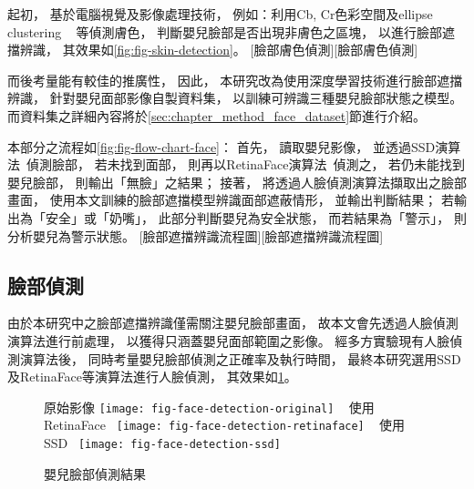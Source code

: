 \documentclass[class=NCU_thesis, crop=false]{standalone}
\begin{document}
起初，
基於電腦視覺及影像處理技術，
例如：利用Cb, Cr色彩空間及ellipse clustering
~\cite{tang_hands_2008, li_face_2011, noauthor_python_nodate, walkonnet_python_nodate}
等偵測膚色，
判斷嬰兒臉部是否出現非膚色之區塊，
以進行臉部遮擋辨識，
其效果如\cref{fig:fig-skin-detection}。
[臉部膚色偵測][臉部膚色偵測]

而後考量能有較佳的推廣性，
因此，
本研究改為使用深度學習技術進行臉部遮擋辨識，
針對嬰兒面部影像自製資料集，
以訓練可辨識三種嬰兒臉部狀態之模型。
而資料集之詳細內容將於\ref{sec:chapter_method_face_dataset}節進行介紹。

本部分之流程如\cref{fig:fig-flow-chart-face}：
首先，
讀取嬰兒影像，
並透過SSD演算法~\cite{ye_face_2021}偵測臉部，
若未找到面部，
則再以RetinaFace演算法~\cite{deng_retinaface_2020}偵測之，
若仍未能找到嬰兒臉部，
則輸出「無臉」之結果；
接著，
將透過人臉偵測演算法擷取出之臉部畫面，
使用本文訓練的臉部遮擋模型辨識面部遮蔽情形，
並輸出判斷結果；
若輸出為「安全」或「奶嘴」，
此部分判斷嬰兒為安全狀態，
而若結果為「警示」，
則分析嬰兒為警示狀態。
[臉部遮擋辨識流程圖][臉部遮擋辨識流程圖]

\subsection{臉部偵測}
由於本研究中之臉部遮擋辨識僅需關注嬰兒臉部畫面，
故本文會先透過人臉偵測演算法進行前處理，
以獲得只涵蓋嬰兒面部範圍之影像。
經多方實驗現有人臉偵測演算法後，
同時考量嬰兒臉部偵測之正確率及執行時間，
最終本研究選用SSD及RetinaFace等演算法進行人臉偵測，
其效果如\cref{fig:fig-face-detection}。
\begin{figure}[!hbt]
    \centering
    \subcaptionbox
        {原始影像
        \label{fig:fig-face-detection-original}}
        {\texttt{[image: fig-face-detection-original]}}
    ~
    \subcaptionbox
        {使用RetinaFace~\cite{deng_retinaface_2020}
        \label{fig:fig-face-detection-retinaface}}
        {\texttt{[image: fig-face-detection-retinaface]}}
    ~
    \subcaptionbox
        {使用SSD~\cite{ye_face_2021}
        \label{fig:fig-face-detection-ssd}}
        {\texttt{[image: fig-face-detection-ssd]}}
    \caption{嬰兒臉部偵測結果}
    \label{fig:fig-face-detection}
\end{figure}
\end{document}
